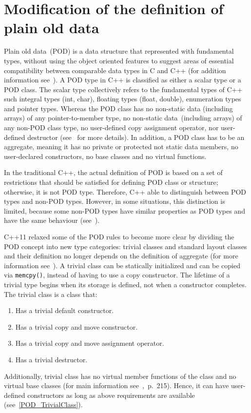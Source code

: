 \documentclass[11pt]{report}
\begin{document}
\section{Modification of the definition of plain old data}
\label{section: Modification of the definition of plain old data}
Plain old data~(POD) is a data structure that represented with fundamental types, without using the object oriented features to suggest areas of essential compatibility between comparable data types in C and C++ (for addition information see~\cite{Stroustrup:2012:Cpp11}). A POD type in C++ is classified as either a scalar type or a POD class. The scalar type collectively refers to the fundamental types of C++ such integral types (int, char), floating types (float, double), enumeration types and pointer types. Whereas the POD class has no non-static data (including arrays) of any pointer-to-member type, no non-static data~(including arrays) of any non-POD class type, no user-defined copy assignment operator, nor user-defined destructor (see~\cite{MSDN:2012:CppModern} for more details). In addition, a POD class has to be an aggregate, meaning it has no private or protected not static data members, no user-declared constructors, no base classes and no virtual functions.

In the traditional C++, the actual definition of POD is based on a set of restrictions that should be satisfied for defining POD class or structure; otherwise, it is not POD type. Therefore, C++ able to distinguish between POD types and non-POD types. However, in some situations, this distinction is limited, because some non-POD types have similar properties as POD types and have the same behaviour (see~\cite{Stroustrup:2012:Cpp11}).

C++11 relaxed some of the POD rules to become more clear by dividing the POD concept into new type categories: trivial classes and standard layout classes and their definition no longer depends on the definition of aggregate (for more information see~\cite{MSDN:2012:CppModern}). A trivial class can be statically initialized and can be copied via \texttt{memcpy()}, instead of having to use a copy constructor. The lifetime of a trivial type begins when its storage is defined, not when a constructor completes. The trivial class is a class that:
\begin{enumerate}
\item	Has a trivial default constructor. 
\item	Has a trivial copy and move constructor.
\item	Has a trivial copy and move assignment operator.
\item	Has a trivial destructor.
\end{enumerate}
Additionally, trivial class has no virtual member functions of the class and no virtual base classes (for main information see~\cite{ISO:2011:Cpplanguage},~p.~215). Hence, it can have user-defined constructors as long as above requirements are available (see~\ref{POD_TrivialClass}).
\end{document}
